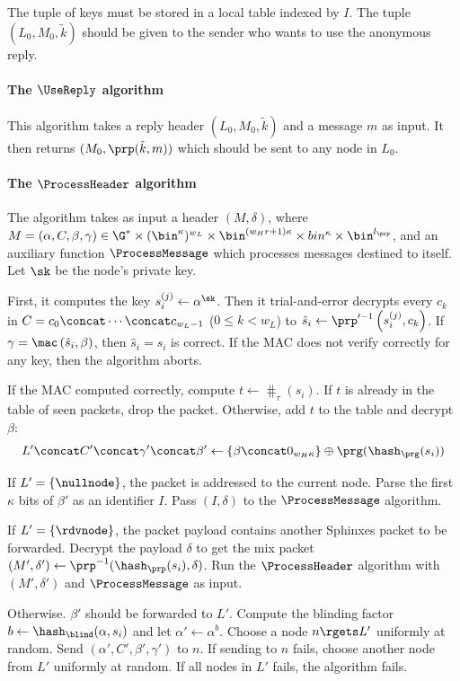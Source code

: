 The tuple of keys must be stored in a local table indexed by \(I\).
The tuple \((L_0, M_0, \tilde k)\) should be given to the sender who wants to 
use the anonymous reply.

\paragraph*{The \(\UseReply\) algorithm}

This algorithm takes a reply header \((L_0, M_0, \tilde k)\) and a message 
\(m\) as input.
It then returns \((M_0, \prp(\tilde k, m))\) which should be sent to any node 
in \(L_0\).

\paragraph*{The \(\ProcessHeader\) algorithm}

The algorithm takes as input a header \((M, \delta)\), where \(M = (\alpha, C, 
  \beta, \gamma)\in \G^*\times (\bin^\kappa)^{w_L} \times \bin^{(w_H 
    r+1)\kappa}\times bin^\kappa\times \bin^{l_\prp}\), and an auxiliary 
function \(\ProcessMessage\) which processes messages destined to itself.
Let \(\sk\) be the node's private key.

First, it computes the key \(s_i^{(j)}\gets \alpha^\sk\).
Then it trial-and-error decrypts every \(c_k\) in \(C = c_0\concat 
  \dotsb\concat c_{w_L-1}\) (\(0\leq k< w_L\)) to \(\hat s_i\gets \prp^{\prime 
    -1}\left(s_i^{(j)}, c_k\right)\).
If \(\gamma = \mac\left(\hat s_i, \beta\right)\), then \(\hat s_i = s_i\) is 
correct.
If the \ac{MAC} does not verify correctly for any key, then the algorithm 
aborts.

If the \ac{MAC} computed correctly, compute \(t\gets \hash_\tau(s_i)\).
If \(t\) is already in the table of seen packets, drop the packet.
Otherwise, add \(t\) to the table and decrypt \(\beta\):
\begin{equation*}
  L'\concat C'\concat \gamma'\concat \beta'\gets \{\beta\concat 0_{w_H 
    \kappa}\}
  \oplus \prg(\hash_\prg(s_i))
\end{equation*}

If \(L' = \{\nullnode\}\), the packet is addressed to the current node.
Parse the first \(\kappa\) bits of \(\beta'\) as an identifier \(I\).
Pass \((I, \delta)\) to the \(\ProcessMessage\) algorithm.

If \(L' = \{\rdvnode\}\), the packet payload contains another Sphinxes packet 
to be forwarded.
Decrypt the payload \(\delta\) to get the mix packet \((M', \delta')\gets 
  \prp^{-1}(\hash_\prp(s_i), \delta)\).
Run the \(\ProcessHeader\) algorithm with \((M', \delta')\) and 
\(\ProcessMessage\) as input.

Otherwise. \(\beta'\) should be forwarded to \(L'\).
Compute the blinding factor \(b\gets \hash_\blind(\alpha, s_i)\) and let 
\(\alpha'\gets \alpha^b\).
Choose a node \(n\rgets L'\) uniformly at random.
Send \((\alpha', C', \beta', \gamma')\) to \(n\).
If sending to \(n\) fails, choose another node from \(L'\) uniformly at random.
If all nodes in \(L'\) fails, the algorithm fails.
